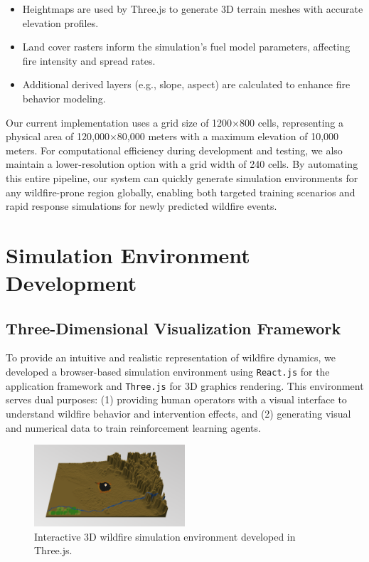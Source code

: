 \documentclass[conference]{IEEEtran}
\begin{document}
\begin{itemize}
    \item Heightmaps are used by Three.js to generate 3D terrain meshes with accurate elevation profiles.
    \item Land cover rasters inform the simulation's fuel model parameters, affecting fire intensity and spread rates.
    \item Additional derived layers (e.g., slope, aspect) are calculated to enhance fire behavior modeling.
\end{itemize}

\noindent
Our current implementation uses a grid size of 1200×800 cells, representing a physical area of 120,000×80,000 meters with a maximum elevation of 10,000 meters. For computational efficiency during development and testing, we also maintain a lower-resolution option with a grid width of 240 cells. By automating this entire pipeline, our system can quickly generate simulation environments for any wildfire-prone region globally, enabling both targeted training scenarios and rapid response simulations for newly predicted wildfire events.

\section{Simulation Environment Development}

\subsection{Three-Dimensional Visualization Framework}
To provide an intuitive and realistic representation of wildfire dynamics, we developed a browser-based simulation environment using \texttt{React.js} for the application framework and \texttt{Three.js} for 3D graphics rendering. This environment serves dual purposes: (1) providing human operators with a visual interface to understand wildfire behavior and intervention effects, and (2) generating visual and numerical data to train reinforcement learning agents.

\begin{figure}[h!]
\centering
\includegraphics[width=0.5\textwidth]{sim.png}
\caption{Interactive 3D wildfire simulation environment developed in Three.js.}
\end{figure}
\end{document}
